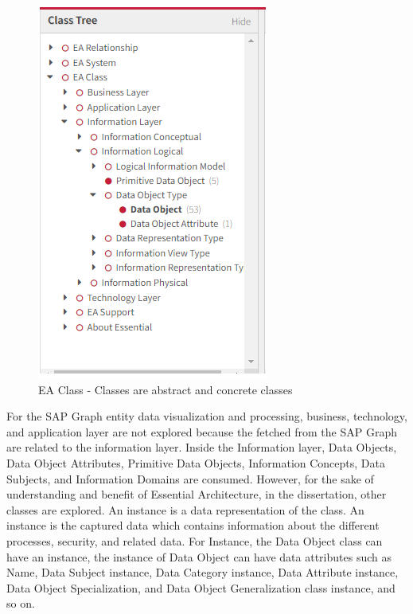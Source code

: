 \documentclass{article}
\begin{document}
\begin{figure}[ht!]
    \centering
    \includegraphics[scale=0.8]{ea-class}
    \caption{EA Class  - 
Classes are abstract and concrete classes }
    \label{fig:ea-class}
\end{figure}

For the SAP Graph entity data visualization and processing, business, technology, and application layer are not explored because the fetched from the SAP Graph are related to the information layer. Inside the Information layer, Data Objects, Data Object Attributes, Primitive Data Objects, Information Concepts, Data Subjects, and Information Domains are consumed. However, for the sake of understanding and benefit of Essential Architecture, in the dissertation, other classes are explored. An instance is a data representation of the class. An instance is the captured data which contains information about the different processes, security, and related data. For Instance, the Data Object class can have an instance, the instance of Data Object can have data attributes such as Name, Data Subject instance, Data Category instance, Data Attribute instance, Data Object Specialization, and Data Object Generalization class instance, and so on.
\end{document}
